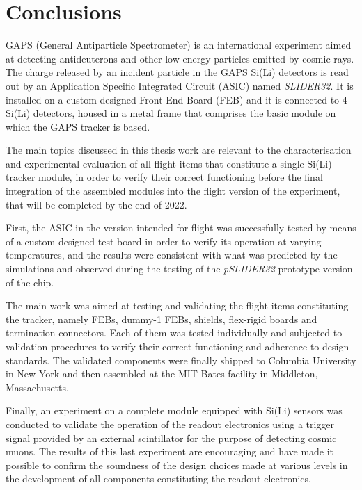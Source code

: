 \chapter*{Conclusions}

\par
GAPS (General Antiparticle Spectrometer) is an international experiment aimed at detecting antideuterons and other low-energy particles emitted by cosmic rays. The charge released by an incident particle in the GAPS Si(Li) detectors is read out by an Application Specific Integrated Circuit (ASIC) named \textit{SLIDER32}. It is installed on a custom designed Front-End Board (FEB) and it is connected to 4 Si(Li) detectors, housed in a metal frame that comprises the basic module on which the GAPS tracker is based.

\par
The main topics discussed in this thesis work are relevant to the characterisation and experimental evaluation of all flight items that constitute a single Si(Li) tracker module, in order to verify their correct functioning before the final integration of the assembled modules into the flight version of the experiment, that will be completed by the end of 2022.

\par
First, the ASIC in the version intended for flight was successfully tested by means of a custom-designed test board in order to verify its operation at varying temperatures, and the results were consistent with what was predicted by the simulations and observed during the testing of the \textit{pSLIDER32} prototype version of the chip.

\par
The main work was aimed at testing and validating the flight items constituting the tracker, namely FEBs, dummy-1 FEBs, shields, flex-rigid boards and termination connectors. Each of them was tested individually and subjected to validation procedures to verify their correct functioning and adherence to design standards. The validated components were finally shipped to Columbia University in New York and then assembled at the MIT Bates facility in Middleton, Massachusetts.

\par
Finally, an experiment on a complete module equipped with Si(Li) sensors was conducted to validate the operation of the readout electronics using a trigger signal provided by an external scintillator for the purpose of detecting cosmic muons. The results of this last experiment are encouraging and have made it possible to confirm the soundness of the design choices made at various levels in the development of all components constituting the readout electronics.


